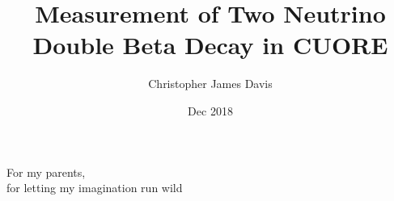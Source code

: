 \documentclass[12 pt]{mythesis}
\author{Christopher James Davis}
\title{Measurement of Two Neutrino Double Beta Decay in CUORE}
\date{Dec 2018}
\begin{document}
\frontmatter

\maketitle

\makecopyright

\tableofcontents
\listoffigures
\listoftables

%
\mainmatter

\begin{flushright}
\null {}
For my parents, \\
for letting my imagination run wild
\null
\end{flushright}









\backmatter
\appendix



\end{document}
